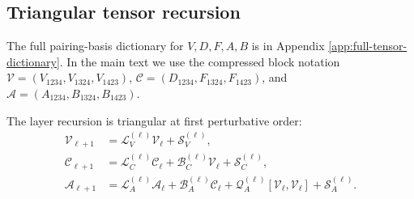 \documentclass{article}
\newcommand{\E}{\mathbb E}
\newcommand{\cumul}{\operatorname{cum}}
\begin{document}
\subsection{Triangular tensor recursion}
The full pairing-basis dictionary for \(V,D,F,A,B\) is in Appendix \ref{app:full-tensor-dictionary}. In the main text we use the compressed block notation \(\mathcal V=(V_{1234},V_{1324},V_{1423})\), \(\mathcal C=(D_{1234},F_{1324},F_{1423})\), and \(\mathcal A=(A_{1234},B_{1324},B_{1423})\).

The layer recursion is triangular at first perturbative order:
\begin{align}
\mathcal V_{\ell+1}
&=
\mathcal L_V^{(\ell)}\mathcal V_\ell+\mathcal S_V^{(\ell)},\\
\mathcal C_{\ell+1}
&=
\mathcal L_C^{(\ell)}\mathcal C_\ell
+\mathcal B_C^{(\ell)}\mathcal V_\ell
+\mathcal S_C^{(\ell)},\\
\mathcal A_{\ell+1}
&=
\mathcal L_A^{(\ell)}\mathcal A_\ell
+\mathcal B_A^{(\ell)}\mathcal C_\ell
+\mathcal Q_A^{(\ell)}[\mathcal V_\ell,\mathcal V_\ell]
+\mathcal S_A^{(\ell)}.
\label{eq:tensor-triangular-recursion}
\end{align}
\end{document}
